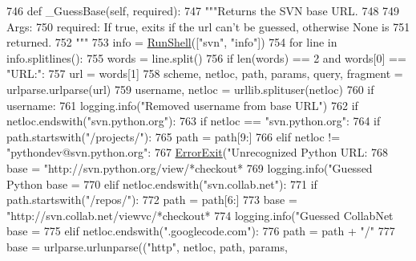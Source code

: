 \begin{DoxyCode}
746   \textcolor{keyword}{def }\_GuessBase(self, required):
747     \textcolor{stringliteral}{"""Returns the SVN base URL.}
748 \textcolor{stringliteral}{}
749 \textcolor{stringliteral}{    Args:}
750 \textcolor{stringliteral}{      required: If true, exits if the url can't be guessed, otherwise None is}
751 \textcolor{stringliteral}{        returned.}
752 \textcolor{stringliteral}{    """}
753     info = \hyperlink{namespaceupload_adddc423c49132e8879cbb25d6be2cf11}{RunShell}([\textcolor{stringliteral}{"svn"}, \textcolor{stringliteral}{"info"}])
754     \textcolor{keywordflow}{for} line \textcolor{keywordflow}{in} info.splitlines():
755       words = line.split()
756       \textcolor{keywordflow}{if} len(words) == 2 \textcolor{keywordflow}{and} words[0] == \textcolor{stringliteral}{"URL:"}:
757         url = words[1]
758         scheme, netloc, path, params, query, fragment = urlparse.urlparse(url)
759         username, netloc = urllib.splituser(netloc)
760         \textcolor{keywordflow}{if} username:
761           logging.info(\textcolor{stringliteral}{"Removed username from base URL"})
762         \textcolor{keywordflow}{if} netloc.endswith(\textcolor{stringliteral}{"svn.python.org"}):
763           \textcolor{keywordflow}{if} netloc == \textcolor{stringliteral}{"svn.python.org"}:
764             \textcolor{keywordflow}{if} path.startswith(\textcolor{stringliteral}{"/projects/"}):
765               path = path[9:]
766           \textcolor{keywordflow}{elif} netloc != \textcolor{stringliteral}{"pythondev@svn.python.org"}:
767             \hyperlink{namespaceupload_adea53186a1d73e92cc839b7c35c2c044}{ErrorExit}(\textcolor{stringliteral}{"Unrecognized Python URL: %
768           base = \textcolor{stringliteral}{"http://svn.python.org/view/*checkout*%
769           logging.info(\textcolor{stringliteral}{"Guessed Python base = %
770         \textcolor{keywordflow}{elif} netloc.endswith(\textcolor{stringliteral}{"svn.collab.net"}):
771           \textcolor{keywordflow}{if} path.startswith(\textcolor{stringliteral}{"/repos/"}):
772             path = path[6:]
773           base = \textcolor{stringliteral}{"http://svn.collab.net/viewvc/*checkout*%
774           logging.info(\textcolor{stringliteral}{"Guessed CollabNet base = %
775         \textcolor{keywordflow}{elif} netloc.endswith(\textcolor{stringliteral}{".googlecode.com"}):
776           path = path + \textcolor{stringliteral}{"/"}
777           base = urlparse.urlunparse((\textcolor{stringliteral}{"http"}, netloc, path, params,
}}}}}
\end{DoxyCode}
